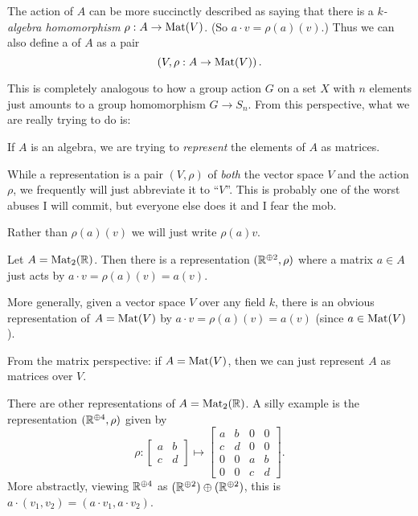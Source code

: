 \begin{definition}
	The action of $A$ can be more succinctly described as saying
	that there is a \emph{$k$-algebra homomorphism} $\rho : A \to \mathrm{Mat}(V)$.
	(So $a \cdot v = \rho(a)(v)$.)
	Thus we can also define a  of $A$ as a pair
	\[ \left( V, \rho : A \to \mathrm{Mat}(V) \right). \]
\end{definition}
This is completely analogous to how a group action $G$ on a set $X$
with $n$ elements just amounts to a group homomorphism $G \to S_n$.
From this perspective, what we are really trying to do is:
\begin{moral}
	If $A$ is an algebra,
	we are trying to \emph{represent}
	the elements of $A$ as matrices.
\end{moral}

\begin{abuse}
	While a representation is a pair $(V, \rho)$
	of \emph{both} the vector space $V$ and the action $\rho$,
	we frequently will just abbreviate it to ``$V$''.
	This is probably one of the worst abuses I will commit,
	but everyone else does it and I fear the mob.
\end{abuse}
\begin{abuse}
	Rather than $\rho(a)(v)$ we will just write $\rho(a)v$.
\end{abuse}

\begin{example}
	\listhack
	\begin{enumerate}[(a)]
		\ii Let $A = \mathrm{Mat}_2(\mathbb R)$.
		Then there is a representation $(\mathbb R^{\oplus 2}, \rho)$
		where a matrix $a \in A$ just acts by $a \cdot v = \rho(a)(v) = a(v)$.

		\ii More generally, given a vector space $V$ over any field $k$,
		there is an obvious representation of $A = \mathrm{Mat}(V)$
		by $a \cdot v = \rho(a)(v) = a(v)$ (since $a \in \mathrm{Mat}(V)$).

		From the matrix perspective: if $A = \mathrm{Mat}(V)$,
		then we can just represent $A$ as matrices over $V$.

		\ii There are other representations of $A = \mathrm{Mat}_2(\mathbb R)$.
		A silly example is the representation $(\mathbb R^{\oplus 4}, \rho)$ given by
		\[
			\rho : 
			\begin{bmatrix} a & b \\ c & d \end{bmatrix} 
			\mapsto
			\begin{bmatrix} a & b & 0 & 0 \\ c & d & 0 & 0 \\
				0 & 0 & a & b \\ 0 & 0 & c & d \end{bmatrix} .
		\]
		More abstractly, viewing $\mathbb R^{\oplus 4}$ as
		$(\mathbb R^{\oplus 2}) \oplus (\mathbb R^{\oplus 2})$,
		this is $a \cdot (v_1,v_2) = (a \cdot v_1, a \cdot v_2)$.
	\end{enumerate}
\end{example}

